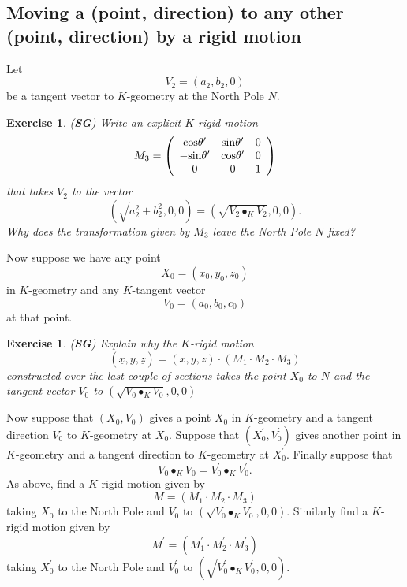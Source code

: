 \documentclass{article}%
\newtheorem{exercise}[theorem]{Exercise}
\begin{document}
\pagebreak

\subsection{Moving a (point, direction) to any other (point, direction) by a
rigid motion}

Let
\[
V_{2}=\left(  a_{2},b_{2},0\right)
\]
be a tangent vector to $K$-geometry at the North Pole $N$.

\begin{exercise}
(\textbf{SG}) Write an explicit $K$-rigid motion%
\[
M_{3}=\left(
\begin{array}
[c]{ccc}%
\mathrm{cos}\theta^{\prime} & \mathrm{sin}\theta^{\prime} & 0\\
-\mathrm{sin}\theta^{\prime} & \mathrm{cos}\theta^{\prime} & 0\\
0 & 0 & 1
\end{array}
\right)
\]
that takes $V_{2}$ to the vector%
\[
\left(  \sqrt{a_{2}^{2}+b_{2}^{2}},0,0\right)  =\left(  \sqrt{V_{2}\bullet
_{K}V_{2}},0,0\right)  .
\]
Why does the transformation given by $M_{3}$ leave the North Pole $N$ fixed?
\end{exercise}

Now suppose we have any point%
\[
X_{0}=\left(  x_{0},y_{0},z_{0}\right)
\]
in $K$-geometry and any $K$-tangent vector%
\[
V_{0}=\left(  a_{0},b_{0},c_{0}\right)
\]
at that point.

\begin{exercise}
(\textbf{SG}) Explain why the $K$-rigid motion%
\[
\left(  \underline{x},\underline{y},\underline{z}\right)  =\left(
x,y,z\right)  \cdot\left(  M_{1}\cdot M_{2}\cdot M_{3}\right)
\]
constructed over the last couple of sections takes the point $X_{0}$ to $N$
and the tangent vector $V_{0}$ to $\left(  \sqrt{V_{0}\bullet_{K}V_{0}%
},0,0\right)  $
\end{exercise}

Now suppose that $\left(  X_{0},V_{0}\right)  $ gives a point $X_{0}$ in
$K$-geometry and a tangent direction $V_{0}$ to $K$-geometry at $X_{0}$.
Suppose that $\left(  X_{0}^{\prime},V_{0}^{\prime}\right)  $ gives another
point in $K$-geometry and a tangent direction to $K$-geometry at
$X_{0}^{\prime}$. Finally suppose that%
\[
V_{0}\bullet_{K}V_{0}=V_{0}^{\prime}\bullet_{K}V_{0}^{\prime}.
\]
As above, find a $K$-rigid motion given by%
\[
M=\left(  M_{1}\cdot M_{2}\cdot M_{3}\right)
\]
taking $X_{0}$ to the North Pole and $V_{0}$ to $\left(  \sqrt{V_{0}%
\bullet_{K}V_{0}},0,0\right)  $. Similarly find a $K$-rigid motion given by%
\[
M^{\prime}=\left(  M_{1}^{\prime}\cdot M_{2}^{\prime}\cdot M_{3}^{\prime
}\right)
\]
taking $X_{0}^{\prime}$ to the North Pole and $V_{0}^{\prime}$ to $\left(
\sqrt{V_{0}^{\prime}\bullet_{K}V_{0}^{\prime}},0,0\right)  .$
\end{document}
